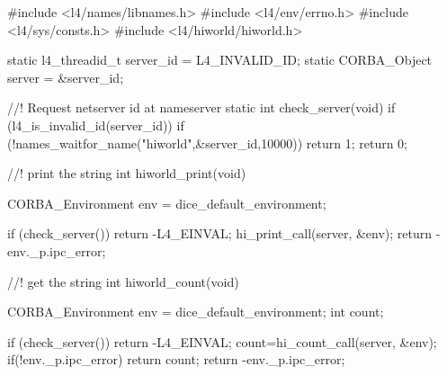 #include <l4/names/libnames.h>
#include <l4/env/errno.h>
#include <l4/sys/consts.h>
#include <l4/hiworld/hiworld.h>

static l4_threadid_t server_id = L4_INVALID_ID;
static CORBA_Object server = &server_id;
            
//! Request netserver id at nameserver
static int check_server(void){
    if (l4_is_invalid_id(server_id)){
        if (!names_waitfor_name("hiworld",&server_id,10000)) return 1;
    }
    return 0;
}

//! print the string
int hiworld_print(void){
    CORBA_Environment env = dice_default_environment;

    if (check_server()) return -L4_EINVAL;
    hi_print_call(server, &env);
    return -env._p.ipc_error;
}
//! get the string
int hiworld_count(void){
    CORBA_Environment env = dice_default_environment;
    int count;

    if (check_server()) return -L4_EINVAL;
    count=hi_count_call(server, &env);
    if(!env._p.ipc_error) return count;
    return -env._p.ipc_error;
}
